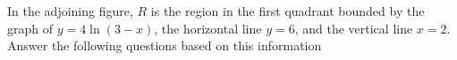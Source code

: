 
%
%
%
%
% 
% 


\question In the adjoining figure, $R$ is the region in the first quadrant bounded by the graph of  
$y =4\ln (3-x)$, the horizontal line $y=6$, and the vertical line $x=2$. Answer the following questions 
based on this information 


